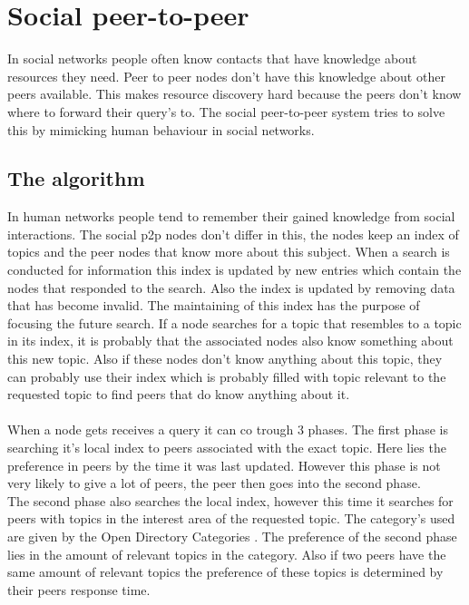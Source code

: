 \section{Social peer-to-peer}
	In social networks people often know contacts that have knowledge about resources they need.
	Peer to peer nodes don't have this knowledge about other peers available.
	This makes resource discovery hard because the peers don't know where to forward their query's to.
	The social peer-to-peer system tries to solve this by mimicking human behaviour in social networks.\\
	
	\subsection{The algorithm}
		In human networks people tend to remember their gained knowledge from social interactions.
		The social p2p nodes don't differ in this, the nodes keep an index of topics and the peer nodes that know more about this subject.
		When a search is conducted for information this index is updated by new entries which contain the nodes that responded to the search.
		Also the index is updated by removing data that has become invalid.
		The maintaining of this index has the purpose of focusing the future search.
		If a node searches for a topic that resembles to a topic in its index, it is probably that the associated nodes also know something about this new topic.
		Also if these nodes don't know anything about this topic, they can probably use their index which is probably filled with topic relevant to the requested topic to find peers that do know anything about it.\\
		\\
		When a node gets receives a query it can co trough 3 phases.
		The first phase is searching it's local index to peers associated with the exact topic.
		Here lies the preference in peers by the time it was last updated.
		However this phase is not very likely to give a lot of peers, the peer then goes into the second phase.\\
		The second phase also searches the local index, however this time it searches for peers with topics in the interest area of the requested topic.
		The category's used are given by the Open Directory Categories \cite{opendir}.
		The preference of the second phase lies in the amount of relevant topics in the category.
		Also if two peers have the same amount of relevant topics the preference of these topics is determined by their peers response time.
